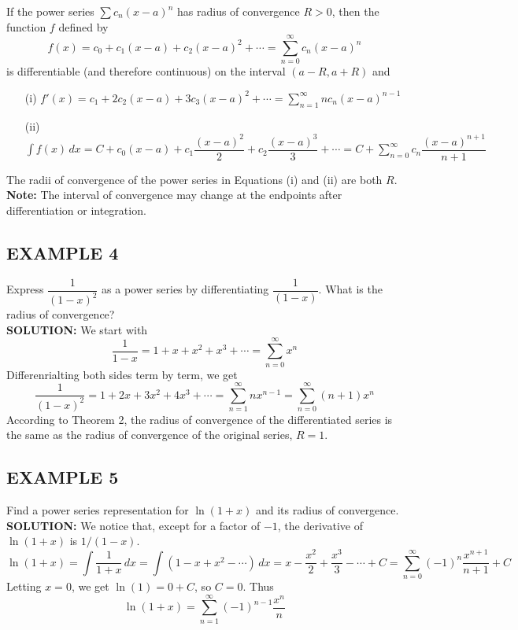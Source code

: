 \documentclass{article}
\theoremstyle{mystyle}
\begin{document}
\begin{tcolorbox}[
    colback=white,
    colframe=orange!80!white,
    title=Theorem 1: Term-by-Term Differentiation and Integration,
    boxrule=0.5mm,
    arc=3mm
    ]
    If the power series \( \sum c_n (x-a)^n \) has radius of convergence \(R > 0\), then the function \(f\) defined by
    \[ f(x) = c_0 + c_1(x-a) + c_2(x-a)^2 + \cdots = \sum_{n=0}^{\infty} c_n (x-a)^n \]
    is differentiable (and therefore continuous) on the interval \((a-R, a+R)\) and
    \begin{itemize}
        \item[(i)] \( f'(x) = c_1 + 2c_2(x-a) + 3c_3(x-a)^2 + \cdots = \sum_{n=1}^{\infty} n c_n (x-a)^{n-1} \)
        \item[(ii)] \( \int f(x) \,dx = C + c_0(x-a) + c_1\dfrac{(x-a)^2}{2} + c_2\dfrac{(x-a)^3}{3} + \cdots = C + \sum_{n=0}^{\infty} c_n \dfrac{(x-a)^{n+1}}{n+1} \)
    \end{itemize}
    The radii of convergence of the power series in Equations (i) and (ii) are both \(R\).
   \\ \textbf{Note:} The interval of convergence may change at the endpoints after differentiation or integration.
\end{tcolorbox}

\subsection*{EXAMPLE 4}
Express $\dfrac{1}{(1-x)^2}$ as a power series by differentiating $\dfrac{1}{(1-x)}$. What is the radius of convergence?\\
\textbf{SOLUTION:}
We start with 
\[\dfrac{1}{1-x} = 1 + x + x^2 + x^3 + \cdots = \sum_{n=0}^{\infty} x^n\]
Differenrialting both sides term by term, we get
\[\dfrac{1}{(1-x)^2} = 1 + 2x + 3x^2 + 4x^3 + \cdots = \sum_{n=1}^{\infty} nx^{n-1}=\sum_{n=0}^{\infty} (n+1)x^n\]
According to Theorem 2, the radius of convergence of the differentiated series is the same as the radius of convergence of the original series, \(R=1\).

\subsection*{EXAMPLE 5}
Find a power series representation for \( \ln(1+x) \) and its radius of convergence.\\
\textbf{SOLUTION:}
We notice that, except for a factor of \(-1\), the derivative of \(\ln(1+x)\) is \(1/(1-x)\).
\[ \ln(1+x) = \int \dfrac{1}{1+x} \,dx = \int (1 - x + x^2 -\cdots) \,dx = x - \dfrac{x^2}{2} + \dfrac{x^3}{3} - \cdots + C = \sum_{n=0}^{\infty} (-1)^{n}\dfrac{x^{n+1}}{n+1} + C \]
Letting \(x=0\), we get \(\ln(1) = 0+C\), so \(C=0\). Thus
\[ \ln(1+x) = \sum_{n=1}^{\infty} (-1)^{n-1}\dfrac{x^{n}}{n} \]
\end{document}
